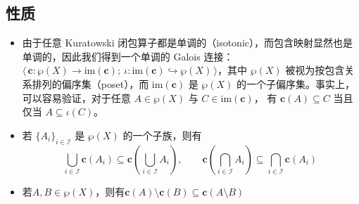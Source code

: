 \subsection{性质}
\begin{itemize}
\item 由于任意 Kuratowski 闭包算子都是单调的（isotonic），而包含映射显然也是单调的，因此我们得到一个单调的 Galois 连接：$\langle\, \mathbf{c} : \wp(X) \to \mathrm{im}(\mathbf{c});\ \iota : \mathrm{im}(\mathbf{c})\hookrightarrow \wp(X) \,\rangle$，其中 $\wp(X)$ 被视为按包含关系排列的偏序集（poset），而 $\mathrm{im}(\mathbf{c})$ 是 $\wp(X)$ 的一个子偏序集。事实上，可以容易验证，对于任意 $A \in \wp(X)$ 与 $C \in \mathrm{im}(\mathbf{c})$，
有 $\mathbf{c}(A) \subseteq C$ 当且仅当 $A \subseteq \iota(C)$。
\item 若 $\{A_{i}\}_{i \in \mathcal{I}}$ 是 $\wp(X)$ 的一个子族，则有
\[
\bigcup_{i \in \mathcal{I}} \mathbf{c}(A_{i})
\subseteq
\mathbf{c}\!\left( \bigcup_{i \in \mathcal{I}} A_{i} \right),
\qquad
\mathbf{c}\!\left( \bigcap_{i \in \mathcal{I}} A_{i} \right)
\subseteq
\bigcap_{i \in \mathcal{I}} \mathbf{c}(A_{i})~
\]
\item 若$A,B \in \wp(X)$，则有$\mathbf{c}(A) \setminus \mathbf{c}(B) \subseteq \mathbf{c}(A \setminus B)$
\end{itemize}